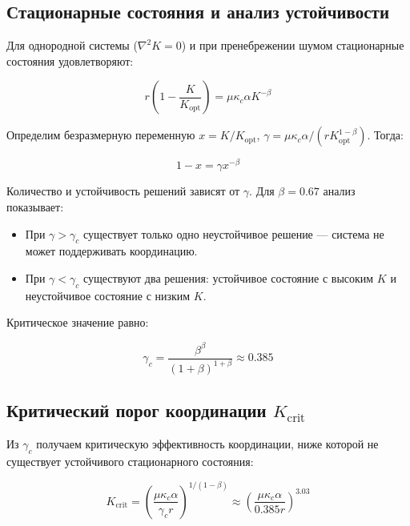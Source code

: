 \documentclass[12pt,a4paper]{article}
\theoremstyle{remark}
\newcommand{\Keffopt}{K_{\mathrm{opt}}}
\newcommand{\Keffcrit}{K_{\mathrm{crit}}}
\newcommand{\kappac}{\kappa_c}
\begin{document}
	\subsection{Стационарные состояния и анализ устойчивости}
	
	Для однородной системы ($\nabla^2 K = 0$) и при пренебрежении шумом стационарные состояния удовлетворяют:
	
	\begin{equation}
		r \left(1 - \frac{K}{\Keffopt}\right) = \mu \kappac \alpha K^{-\beta}
		\label{eq:stationary}
	\end{equation}
	
	Определим безразмерную переменную $x = K/\Keffopt$, $\gamma = \mu \kappac \alpha / (r \Keffopt^{1-\beta})$. Тогда:
	
	\begin{equation}
		1 - x = \gamma x^{-\beta}
		\label{eq:dimensionless}
	\end{equation}
	
	Количество и устойчивость решений зависят от $\gamma$. Для $\beta = 0.67$ анализ показывает:
	
	\begin{itemize}
		\item При $\gamma > \gamma_c$ существует только одно неустойчивое решение — система не может поддерживать координацию.
		\item При $\gamma < \gamma_c$ существуют два решения: устойчивое состояние с высоким $K$ и неустойчивое состояние с низким $K$.
	\end{itemize}
	
	Критическое значение равно:
	
	\begin{equation}
		\gamma_c = \frac{\beta^{\beta}}{(1+\beta)^{1+\beta}} \approx 0.385
		\label{eq:gamma_c}
	\end{equation}
	
	\subsection{Критический порог координации $\Keffcrit$}
	
	Из $\gamma_c$ получаем критическую эффективность координации, ниже которой не существует устойчивого стационарного состояния:
	
	\begin{equation}
		\Keffcrit = \left( \frac{\mu \kappac \alpha}{\gamma_c r} \right)^{1/(1-\beta)} \approx \left( \frac{\mu \kappac \alpha}{0.385 r} \right)^{3.03}
		\label{eq:Kcrit}
	\end{equation}
	
\end{document}
